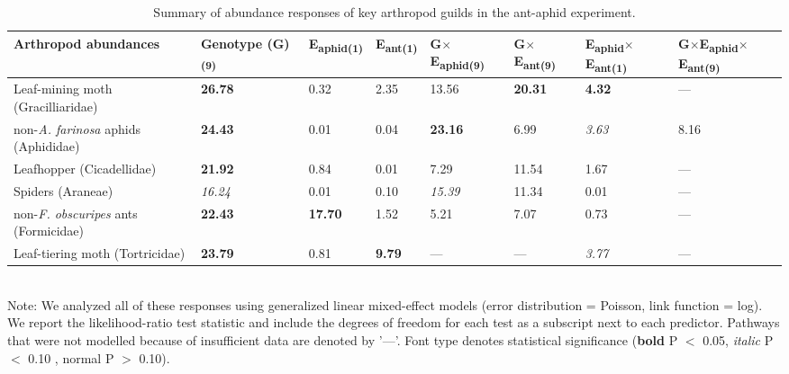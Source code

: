 \documentclass[11pt]{article}
\begin{document}
\begin{table}
\centering
\caption{Summary of abundance responses of key arthropod
guilds in the ant-aphid experiment.}
\label{aaGuild}
\begin{tabular}{@{}llllllll@{}}
\toprule
Arthropod abundances               & Genotype (G)\textsubscript{(9)} & E\textsubscript{aphid(1)} & E\textsubscript{ant(1)} & G$\times$E\textsubscript{aphid(9)} & G$\times$E\textsubscript{ant(9)} & E\textsubscript{aphid}$\times$E\textsubscript{ant(1)} & G$\times$E\textsubscript{aphid}$\times$E\textsubscript{ant(9)} \\
\midrule
Leaf-mining moth (Gracilliaridae)   & \textbf{26.78}           & 0.32      & 2.35    & 13.56       & \textbf{20.31}     & \textbf{4.32}           & ---                \\
non-\textit{A. farinosa} aphids (Aphididae)  & \textbf{24.43}           & 0.01      & 0.04    & \textbf{23.16}       & 6.99      & \textit{3.63}           & 8.16             \\
Leafhopper (Cicadellidae)           & \textbf{21.92}           & 0.84      & 0.01    & 7.29        & 11.54     & 1.67           & ---                \\
Spiders (Araneae)                   & \textit{16.24}           & 0.01      & 0.10     & \textit{15.39}       & 11.34     & 0.01           & ---                \\
non-\textit{F. obscuripes} ants (Formicidae) & \textbf{22.43}           & \textbf{17.70}      & 1.52    & 5.21        & 7.07      & 0.73           & ---                \\
Leaf-tiering moth (Tortricidae)     & \textbf{23.79}           & 0.81      & \textbf{9.79}    & ---           & ---         & \textit{3.77}           &    --- \\
\bottomrule
\end{tabular}
\bigskip{}
\\
{\footnotesize Note: We analyzed all of these responses
using generalized linear mixed-effect models (error distribution = Poisson, link function = log). We report the likelihood-ratio test statistic and include the degrees of freedom for each test as a subscript next to each predictor. Pathways that were not modelled because of insufficient data are denoted by '---'. Font type denotes statistical significance (\textbf{bold} P $<$ 0.05, \textit{italic} P $<$ 0.10 , normal P $>$ 0.10).}
\end{table}
\end{document}
